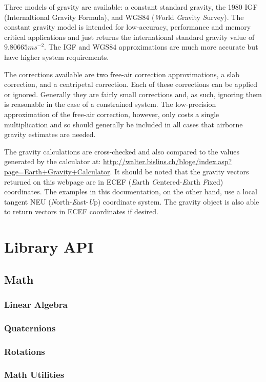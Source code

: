 \documentclass[10pt,letterpaper]{memoir} %
\begin{document}
Three models of gravity are available: a constant standard gravity, the 1980 IGF (Internaltional Gravity Formula), and WGS84 (\emph{W}orld \emph{G}ravity \emph{S}urvey).  The constant gravity model is intended for low-accuracy, performance and memory critical applications and just returns the international standard gravity value of $9.80665 ms^{-2}$.  The IGF and WGS84 approximations are much more accurate but have higher system requirements.

The corrections available are two free-air correction approximations, a slab correction, and a centripetal correction.  Each of these corrections can be applied or ignored.  Generally they are fairly small corrections and, as such, ignoring them is reasonable in the case of a constrained system.  The low-precision approximation of the free-air correction, however, only costs a single multiplication and so should generally be included in all cases that airborne gravity estimates are needed.

The gravity calculations are cross-checked and also compared to the values generated by the calculator at: \url{http://walter.bislins.ch/bloge/index.asp?page=Earth+Gravity+Calculator}.  It should be noted that the gravity vectors returned on this webpage are in ECEF (\emph{E}arth \emph{C}entered-\emph{E}arth \emph{F}ixed) coordinates.  The examples in this documentation, on the other hand, use a local tangent NEU (\emph{N}orth-\emph{E}ast-\emph{U}p) coordinate system.  The gravity object is also able to return vectors in ECEF coordinates if desired.

\part{Library API}
\chapter{Math}
\section{Linear Algebra}
\section{Quaternions}
\section{Rotations}
\section{Math Utilities}
\end{document}

